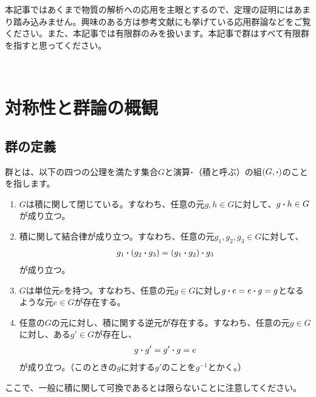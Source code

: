 \documentclass[uplatex,dvipdfmx,a4j,openany]{jsarticle}
\begin{document}
本記事ではあくまで物質の解析への応用を主眼とするので、定理の証明にはあまり踏み込みません。興味のある方は参考文献にも挙げている応用群論\cite{ouyougunron}などをご覧ください。また、本記事では有限群のみを扱います。本記事で群はすべて有限群を指すと思ってください。


 


\section{対称性と群論の概観}
\subsection{群の定義}
群とは、以下の四つの公理を満たす集合$G$と演算$\vdot$（積と呼ぶ）の組$(G, \vdot)$のことを指します。
\begin{tcolorbox}[title = 群の公理]
	\begin{enumerate}
		\item $G$は積に関して閉じている。すなわち、任意の元$g, h \in G$に対して、$g\vdot h\in G$が成り立つ。
		\item 積に関して結合律が成り立つ。すなわち、任意の元$g_1, g_2, g_3 \in G$に対して、\begin{align}
			g_1 \vdot (g_2 \vdot g_3) = (g_1 \vdot g_2) \vdot g_3
		\end{align}
		が成り立つ。
		\item $G$は単位元$e$を持つ。すなわち、任意の元$g\in G$に対し$g\vdot e = e\vdot g = g$となるような元$e\in G$が存在する。
		\item 任意の$G$の元に対し、積に関する逆元が存在する。すなわち、任意の元$g\in G$に対し、ある$g'\in G$が存在し、\begin{align}
			g \vdot g' = g' \vdot g = e
		\end{align}が成り立つ。（このときの$g$に対する$g'$のことを$g^{-1}$とかく。）
	\end{enumerate}	
\end{tcolorbox}

ここで、一般に積に関して可換であるとは限らないことに注意してください。
\end{document}
